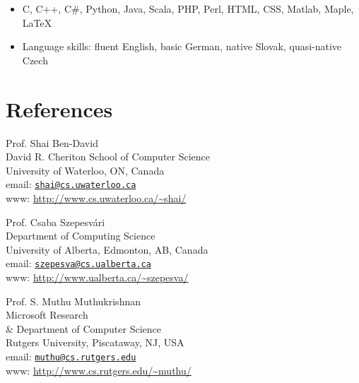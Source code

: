 \documentclass[10pt]{article}
\begin{document}
\begin{itemize}
\item C, C++, C\#, Python, Java, Scala, PHP, Perl, HTML, CSS, Matlab, Maple, LaTeX
\item Language skills: fluent English, basic German, native Slovak, quasi-native Czech
\end{itemize}


\section*{References}
%
\begin{minipage}[t]{9cm}
Prof. Shai Ben-David \\
David R. Cheriton School of Computer Science \\
University of Waterloo, ON, Canada \\
email: \href{mailto:shai@cs.uwaterloo.ca}{\texttt{shai@cs.uwaterloo.ca}} \\
www: \url{http://www.cs.uwaterloo.ca/~shai/}
\end{minipage}
%
\begin{minipage}[t]{9cm}
Prof. Csaba Szepesv\'ari \\
Department of Computing Science \\
University of Alberta, Edmonton, AB, Canada \\
email: \href{mailto:szepesva@cs.ualberta.ca}{\texttt{szepesva@cs.ualberta.ca}} \\
www: \url{http://www.ualberta.ca/~szepesva/}
\end{minipage}

\vspace{1cm}

\noindent
\begin{minipage}[t]{9cm}
Prof. S. Muthu Muthukrishnan \\
Microsoft Research \\
\& Department of Computer Science \\
Rutgers University, Piscataway, NJ, USA \\
email: \href{mailto:muthu@cs.rutgers.edu}{\texttt{muthu@cs.rutgers.edu}} \\
www: \url{http://www.cs.rutgers.edu/~muthu/}
\end{minipage}
\end{document}
